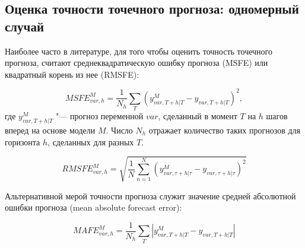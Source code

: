 \documentclass[11pt]{article} %
\begin{document}
\subsection{Оценка точности точечного прогноза: одномерный случай}


 Наиболее часто в литературе, для того чтобы оценить точность  точечного прогноза, считают среднеквадратическую ошибку прогноза (MSFE) или квадратный корень из нее (RMSFE):

\begin{equation}
MSFE_{var,h}^{M}=\frac{1}{N_h}\sum_{T} (y_{var,T+h|T}^{M}-y_{var,T+h|T})^2,
\end{equation}
где $y_{var,T+h|T}^{M}$ "--- прогноз переменной $var$, сделанный в момент $T$ на $h$ шагов вперед на основе модели $M$. Число $N_h$ отражает количество таких прогнозов для горизонта $h$, сделанных для разных $T$.

\begin{equation}
RMSFE_{var,h}^{M}=\sqrt{\frac{1}{N}\sum_{n=1}^{N} \left(y_{var,\tau+h|\tau}^{M}-y_{var,\tau+h|\tau}\right)^2}
\end{equation}

Альтернативной мерой точности прогноза служит значение средней абсолютной ошибки прогноза (mean absolute forecast error):


\begin{equation}
MAFE_{var,h}^{M}=\frac{1}{N_h}\sum_{T} |y_{var,T+h|T}^{M}-y_{var,T+h|T}|
\end{equation}
\end{document}
